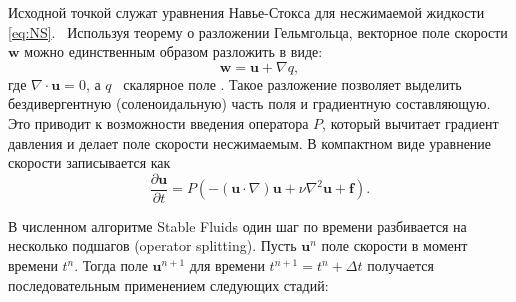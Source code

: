 Исходной точкой служат уравнения Навье-Стокса для
несжимаемой жидкости \eqref{eq:NS}.~ Используя теорему о разложении Гельмгольца, векторное поле скорости $\mathbf{w}$ можно единственным образом разложить в виде:
\begin{equation}\label{eq:helmholtz}
      \mathbf{w} = \mathbf{u} + \nabla q,
\end{equation}
где $\nabla\cdot\mathbf{u} = 0$, а $q$~ \textemdash{} скалярное поле \cite{stamstablefluids}. Такое разложение позволяет выделить бездивергентную (соленоидальную) часть поля и градиентную составляющую. Это приводит к возможности введения оператора $P$, который вычитает градиент давления
и делает поле скорости несжимаемым. В компактном виде
уравнение скорости записывается как
\begin{equation}\label{eq:NS_projection}
      \frac{\partial \mathbf{u}}{\partial t}
      =
      P\!\left(
      -(\mathbf{u}\cdot\nabla)\mathbf{u}
      + \nu \nabla^2 \mathbf{u}
      + \mathbf{f}
      \right).
\end{equation}

В численном алгоритме Stable Fluids один шаг по времени
разбивается на несколько подшагов (operator splitting). Пусть
$\mathbf{u}^n$ \textemdash{} поле скорости в момент времени $t^n$. Тогда
поле $\mathbf{u}^{n+1}$ для времени $t^{n+1}=t^n+\Delta t$
получается последовательным применением следующих стадий:

